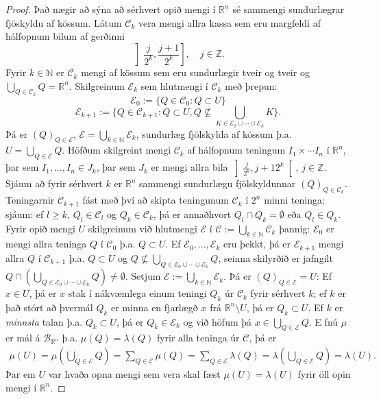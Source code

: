 \documentclass[a4paper,icelandic,11pt]{book}
\theoremstyle{plain}      \newtheorem{setn}{Setning}[chapter]
\theoremstyle{definition} \newtheorem{skilgr}[setn]{Skilgreining}
\theoremstyle{remark}     \newtheorem*{ath}{Athugasemd}
\newcommand{\R}{\mathbb R}
\newcommand{\N}{\mathbb N}
\newcommand{\Z}{\mathbb Z}
\begin{document}
\begin{proof}
  Það nægir að sýna að sérhvert opið mengi í $\R^{n}$ sé sammengi
  sundurlægrar fjöskyldu af kössum. Látum $\mathcal C_{k}$ vera mengi
  allra kassa sem eru margfeldi af hálfopnum bilum af gerðinni
  \[
  \left]\frac j{2^{k}},\frac{j+1}{2^{k}}\right], \quad j\in\Z.
  \]
  Fyrir $k\in\N$ er $\mathcal C_{k}$ mengi af kössum sem eru
  sundurlægir tveir og tveir og
  $\bigcup_{Q\in\mathcal{C}_{k}}Q=\R^{n}$. Skilgreinum
  $\mathcal{E}_{k}$ sem hlutmengi í $\mathcal C_{k}$ með þrepun:
  \[
  \mathcal E_{0} := \{ Q\in\mathcal C_{0} : Q\subset U \}
  \]
  \[
  \mathcal E_{k+1} := \{ Q\in\mathcal C_{k+1} : Q\subset U,
  Q\nsubseteq\bigcup_{K\in\mathcal E_{0}\cup\cdots\cup\mathcal E_{k}} K
  \}.
  \]
  Þá er $(Q)_{Q\in\mathcal E}$,
  $\mathcal{E}=\bigcup_{k\in\N}\mathcal{E}_{k}$, sundurlæg fjölskylda
  af kössum þ.a. $U=\bigcup_{Q\in\mathcal{E}} Q$.
  Höfðum skilgreint mengi $\mathcal C_{k}$ af hálfopnum teningum
  $I_{1}\times\cdots{I_{n}}$ í $\R^{n}$, þar sem
  $I_{1},\dots,I_{n}\in{J_{k}}$, þar sem $J_{k}$ er mengi allra bila
  $\left]\frac{j}{2^{k}},{j+1}{2^{k}}\right[$, $j\in\Z$. Sjáum að
  fyrir sérhvert $k$ er $\R^{n}$ sammengi sundurlægu fjölskyldunnar
  $(Q)_{Q\in\mathcal{C}_{k}}$. Teningarnir $\mathcal{C}_{k+1}$ fást
  með því að skipta teningunum $\mathcal{C}_{k}$ í $2^{n}$ minni
  teninga; sjáum: ef $l\ge k$, $Q_{l}\in\mathcal{C}_{l}$ og
  $Q_{k}\in\mathcal{C}_{k}$, þá er annaðhvort
  $Q_{l}\cap{Q_{k}}=\emptyset$ eða $Q_{l}\in{Q_{k}}$. Fyrir opið mengi
  $U$ skilgreinum við hlutmengi $\mathcal E$ í $\mathcal
  C:=\bigcup_{k\in\N}\mathcal C_{k}$ þannig: $\mathcal E_{0}$ er mengi
  allra teninga $Q$ í $\mathcal C_0$ þ.a. $Q\subset U$. Ef $\mathcal
  E_{0},\dots,\mathcal E_{k}$ eru þekkt, þá er $\mathcal{E}_{k+1}$
  mengi allra $Q$ í $\mathcal C_{k+1}$ þ.a. $Q\subset U$ og
  $Q\nsubseteq\bigcup_{Q\in\mathcal{E}_{0}\cup\cdots\cup\mathcal{E}_{k}}Q$,
  seinna skilyrðið er jafngilt
  $Q\cap\left(\bigcup_{Q\in\mathcal{E}_{0}\cup\cdots\cup\mathcal{E}_{k}}Q\right)\ne\emptyset$. Setjum
  $\mathcal{E}:=\bigcup_{k\in\N}\mathcal{E}_{k}$. Þá er
  $(Q)_{Q\in\mathcal E}=U$: Ef $x\in U$, þá er $x$ stak í nákvæmlega
  einum teningi $Q_{k}$ úr $\mathcal C_{k}$ fyrir sérhvert $k$; ef $k$
  er það stórt að þvermál $Q_{k}$ er minna en fjarlægð $x$ frá
  $\R^{n}\setminus{U}$, þá er $Q_{k}\subset U$. Ef $k$ er
  \emph{minnsta} talan þ.a. $Q_{k}\subset U$, þá er $Q_{k}\in\mathcal
  E_{k}$ og við höfum þá $x\in\bigcup_{Q\in\mathcal E}Q$. E fnú $\mu$
  er mál á $\mathcal{B}_{\R^{n}}$ þ.a. $\mu(Q)=\lambda(Q)$ fyrir alla
  teninga úr $\mathcal C$, þá er
  \begin{align*}
    \mu(U)
    = \mu(\bigcup_{Q\in\mathcal E}Q)
    = \sum_{Q\in\mathcal E}\mu(Q)
    = \sum_{Q\in\mathcal E}\lambda(Q)
    = \lambda(\bigcup_{Q\in\mathcal E}Q)
    = \lambda(U).
  \end{align*}
  Þar em $U$ var hvaða opna mengi sem vera skal fæst $\mu(U)=\lambda(U)$
  fyrir öll opin mengi í $\R^{n}$. 
\end{proof}
\end{document}
